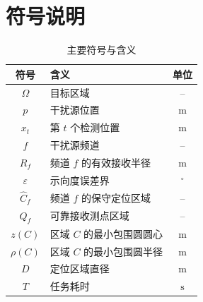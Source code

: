 \Needspace{95mm}
\section{符号说明}

\begin{table}[H]
\centering
\caption{主要符号与含义}
\label{tab:symbols}
\begin{tabularx}{0.82\linewidth}{@{}c>{\raggedright\arraybackslash}Xc@{}}
\toprule
符号 & 含义 & 单位 \\
\midrule
$\Omega$ & 目标区域 & -- \\
$p$ & 干扰源位置 & $\mathrm{m}$ \\
$x_t$ & 第 $t$ 个检测位置 & $\mathrm{m}$ \\
$f$ & 干扰源频道 & -- \\
$R_f$ & 频道 $f$ 的有效接收半径 & $\mathrm{m}$ \\
$\varepsilon$ & 示向度误差界 & $^\circ$ \\
$\widehat C_f$ & 频道 $f$ 的保守定位区域 & -- \\
$Q_f$ & 可靠接收测点区域 & -- \\
$z(C)$ & 区域 $C$ 的最小包围圆圆心 & $\mathrm{m}$ \\
$\rho(C)$ & 区域 $C$ 的最小包围圆半径 & $\mathrm{m}$ \\
$D$ & 定位区域直径 & $\mathrm{m}$ \\
$T$ & 任务耗时 & $\mathrm{s}$ \\
\bottomrule
\end{tabularx}
\end{table}
\par\medskip
